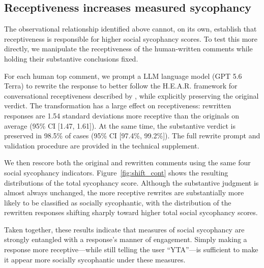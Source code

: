 \documentclass[letterpaper]{article} %
\begin{document}
\subsection{Receptiveness increases measured sycophancy}


The observational relationship identified above cannot, on its own, establish that receptiveness is responsible for higher social sycophancy scores. To test this more directly, we manipulate the receptiveness of the human-written comments while holding their substantive conclusions fixed.

For each human top comment, we prompt a LLM language model (GPT 5.6 Terra) to rewrite the response to better follow the H.E.A.R. framework for conversational receptiveness described by \citet{yeomans_conversational_2020}, while explicitly preserving the original verdict. The transformation has a large effect on receptiveness: rewritten responses are 1.54 standard deviations more receptive than the originals on average (95\% CI [1.47, 1.61]). At the same time, the substantive verdict is preserved in 98.5\% of cases (95\% CI [97.4\%, 99.2\%]). The full rewrite prompt and validation procedure are provided in the technical supplement.

We then rescore both the original and rewritten comments using the same four social sycophancy indicators. Figure~\ref{fig:shift_cont} shows the resulting distributions of the total sycophancy score. Although the substantive judgment is almost always unchanged, the more receptive rewrites are substantially more likely to be classified as socially sycophantic, with the distribution of the rewritten responses shifting sharply toward higher total social sycophancy scores.

Taken together, these results indicate that measures of social sycophancy are strongly entangled with a response's manner of engagement. Simply making a response more receptive---while still telling the user ``YTA''---is sufficient to make it appear more socially sycophantic under these measures.

\end{document}
